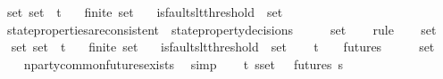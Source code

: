 \begin{isabellebody}
\ \ {\isachardoublequoteopen}{\isasymforall}\ {\isasymsigma}{\isacharunderscore}set{\isachardot}\ {\isasymsigma}{\isacharunderscore}set\ {\isasymsubseteq}\ {\isasymSigma}t\isanewline
\ \ {\isasymlongrightarrow}\ finite\ {\isasymsigma}{\isacharunderscore}set\isanewline
\ \ {\isasymlongrightarrow}\ is{\isacharunderscore}faults{\isacharunderscore}lt{\isacharunderscore}threshold\ {\isacharparenleft}{\isasymUnion}\ {\isasymsigma}{\isacharunderscore}set{\isacharparenright}\isanewline
\ \ {\isasymlongrightarrow}\ state{\isacharunderscore}properties{\isacharunderscore}are{\isacharunderscore}consistent\ {\isacharparenleft}{\isasymUnion}\ {\isacharbraceleft}state{\isacharunderscore}property{\isacharunderscore}decisions\ {\isasymsigma}\ {\isacharbar}\ {\isasymsigma}{\isachardot}\ {\isasymsigma}\ {\isasymin}\ {\isasymsigma}{\isacharunderscore}set{\isacharbraceright}{\isacharparenright}{\isachardoublequoteclose}\isanewline
%
\isadelimproof
\ \ %
\endisadelimproof
%
\isatagproof
{}\isamarkupfalse%
\ rule{\isacharplus}\isanewline
{}\isamarkupfalse%
{\isacharminus}\isanewline
\ \ \isamarkupfalse%
\ {\isasymsigma}{\isacharunderscore}set\isanewline
\ \ \isamarkupfalse%
\ {\isasymsigma}{\isacharunderscore}set{\isacharcolon}\ {\isachardoublequoteopen}{\isasymsigma}{\isacharunderscore}set\ {\isasymsubseteq}\ {\isasymSigma}t{\isachardoublequoteclose}\isanewline
\ \ \ {\isachardoublequoteopen}finite\ {\isasymsigma}{\isacharunderscore}set{\isachardoublequoteclose}\isanewline
\ \ \ {\isachardoublequoteopen}is{\isacharunderscore}faults{\isacharunderscore}lt{\isacharunderscore}threshold\ {\isacharparenleft}{\isasymUnion}\ {\isasymsigma}{\isacharunderscore}set{\isacharparenright}{\isachardoublequoteclose}\isanewline
\ \ \isamarkupfalse%
\ {\isachardoublequoteopen}{\isasymexists}{\isasymsigma}{\isasymin}{\isasymSigma}t{\isachardot}\ {\isasymsigma}\ {\isasymin}\ {\isasymInter}\ {\isacharbraceleft}futures\ {\isasymsigma}\ {\isacharbar}\ {\isasymsigma}{\isachardot}\ {\isasymsigma}\ {\isasymin}\ {\isasymsigma}{\isacharunderscore}set{\isacharbraceright}{\isachardoublequoteclose}\isanewline
\ \ \ \ \isamarkupfalse%
\ n{\isacharunderscore}party{\isacharunderscore}common{\isacharunderscore}futures{\isacharunderscore}exists\ \isamarkupfalse%
\ simp\isanewline
\ \ \isamarkupfalse%
\ {\isachardoublequoteopen}{\isasymexists}{\isasymsigma}{\isasymin}{\isasymSigma}t{\isachardot}\ {\isasymforall}s{\isasymin}{\isasymsigma}{\isacharunderscore}set{\isachardot}\ {\isasymsigma}\ {\isasymin}\ futures\ s{\isachardoublequoteclose}\isanewline

\end{isabellebody}
